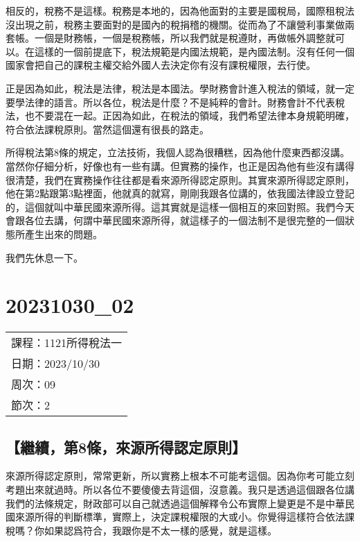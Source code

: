 \documentclass[]{ctexbook}
\begin{document}
相反的，稅務不是這樣。稅務是本地的，因為他面對的主要是國稅局，國際租稅法沒出現之前，稅務主要面對的是國內的稅捐稽的機關。從而為了不讓營利事業做兩套帳。一個是財務帳，一個是稅務帳，所以我們就是稅遵財，再做帳外調整就可以。在這樣的一個前提底下，稅法規範是内國法規範，是內國法制。沒有任何一個國家會把自己的課稅主權交給外國人去決定你有沒有課稅權限，去行使。

正是因為如此，稅法是法律，稅法是本國法。學財務會計進入稅法的領域，就一定要學法律的語言。所以各位，稅法是什麼？不是純粹的會計。財務會計不代表稅法，也不要混在一起。正因為如此，在稅法的領域，我們希望法律本身規範明確，符合依法課稅原則。當然這個還有很長的路走。

所得稅法第8條的規定，立法技術，我個人認為很糟糕，因為他什麼東西都沒講。當然你仔細分析，好像也有一些有講。但實務的操作，也正是因為他有些沒有講得很清楚，我們在實務操作往往都是看來源所得認定原則。其實來源所得認定原則，他在第2點跟第3點裡面，他就真的就寫，剛剛我跟各位講的，依我國法律設立登記的，這個就叫中華民國來源所得。這其實就是這樣一個相互的來回對照。我們今天會跟各位去講，何謂中華民國來源所得，就這樣子的一個法制不是很完整的一個狀態所產生出來的問題。

我們先休息一下。

\hypertarget{section-16}{%
\chapter{20231030\_02}\label{section-16}}

\begin{longtable}[]{@{}l@{}}
\toprule()
\endhead
課程：1121所得稅法一 \\
日期：2023/10/30 \\
周次：09 \\
節次：2 \\
\bottomrule()
\end{longtable}

\hypertarget{ux7e7cux7e8cux7b2c8ux689dux4f86ux6e90ux6240ux5f97ux8a8dux5b9aux539fux5247}{%
\section{【繼續，第8條，來源所得認定原則】}\label{ux7e7cux7e8cux7b2c8ux689dux4f86ux6e90ux6240ux5f97ux8a8dux5b9aux539fux5247}}

來源所得認定原則，常常更新，所以實務上根本不可能考這個。因為你考可能立刻考題出來就過時。所以各位不要傻傻去背這個，沒意義。我只是透過這個跟各位講我們的法條規定，財政部可以自己就透過這個解釋令公布實際上變更是不是中華民國來源所得的判斷標準，實際上，決定課稅權限的大或小。你覺得這樣符合依法課稅嗎？你如果認爲符合，我跟你是不太一樣的感覺，就是這樣。
\end{document}
